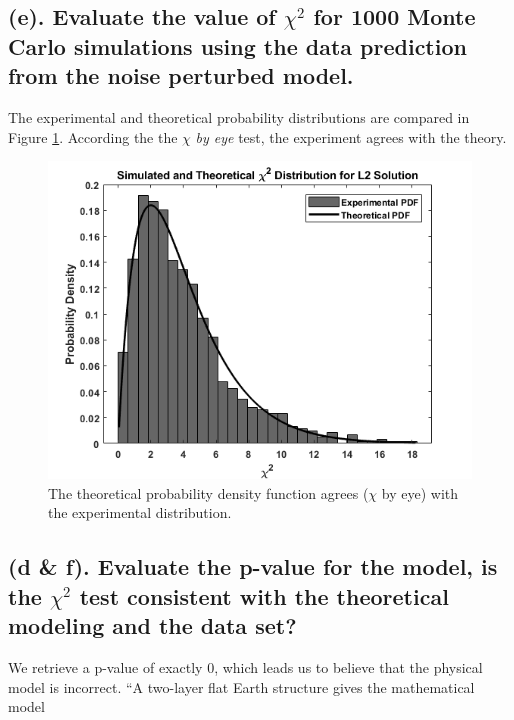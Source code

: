 \documentclass{article}
\begin{document}
\subsection*{(e). Evaluate the value of $\chi^2$ for 1000 Monte Carlo simulations using the data prediction from the noise perturbed model.}

The experimental and theoretical probability distributions are compared in Figure \ref{fig:X2}. According the the $\chi$ \textit{by eye} test, the experiment agrees with the theory.
\begin{figure}[p]
    \centering
    \includegraphics[width =.875 \textwidth]{X2pdf.png}
    \caption{The theoretical probability density function agrees ($\chi$ by eye) with the experimental distribution. }
    \label{fig:X2}
\end{figure}

\subsection*{(d \& f). Evaluate the p-value for the model, is the $\chi^2$ test consistent with the theoretical modeling and the data set?}
We retrieve a p-value of exactly $0$, which leads us to believe that the physical model is incorrect. ``A two-layer flat Earth structure gives the mathematical model
\end{document}
